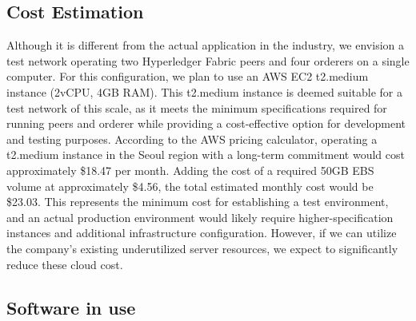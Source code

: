 \documentclass[conference]{IEEEtran}
\begin{document}
\par

\subsection{Cost Estimation}

Although it is different from the actual application in the industry, we
envision a test network operating two Hyperledger Fabric peers and four orderers
on a single computer. For this configuration, we plan to use an AWS EC2 t2.medium
instance (2vCPU, 4GB RAM). This t2.medium instance is deemed suitable for a
test network of this scale, as it meets the minimum specifications required for
running peers and orderer while providing a cost-effective option for development
and testing purposes. According to the AWS pricing calculator, operating a t2.medium
instance in the Seoul region with a long-term commitment would cost approximately
\$18.47 per month. Adding the cost of a required 50GB EBS volume at approximately
\$4.56, the total estimated monthly cost would be \$23.03. This represents the
minimum cost for establishing a test environment, and an actual production
environment would likely require higher-specification instances and additional
infrastructure configuration. However, if we can utilize the company's
existing underutilized server resources, we expect to significantly reduce these
cloud cost.

\subsection{Software in use}
\end{document}
